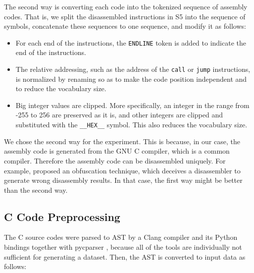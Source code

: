 \documentclass[senior,final,11pt]{iscs-thesis}
\begin{document}
The second way is converting each code into the tokenized sequence of assembly codes. 
That is, we split the disassembled instructions in S5 into the sequence of symbols, 
concatenate these sequences to one sequence, 
and modify it as follows:
\begin{itemize}
\item For each end of the instructions, the \texttt{ENDLINE} token is added to indicate the end of the instructions.
\item 
The relative addressing, such as the address of the \texttt{call} or \texttt{jump} instructions, 
is normalized by renaming so as to make the code position independent and to reduce the vocabulary size.
\item Big integer values are clipped. 
More specifically, an integer in the range from -255 to 256 are preserved as it is, and other integers are clipped and substituted with the \texttt{\_\_HEX\_\_} symbol.
This also reduces the vocabulary size.
\end{itemize}

We chose the second way for the experiment.
This is because, in our case, the assembly code is generated from the GNU C compiler, which is a common compiler.
Therefore the assembly code can be disassembled uniquely.
For example, \citet{disasm_obfuscate} proposed an obfuscation technique, which deceives a disassembler to generate wrong disassembly results.
In that case, the first way might be better than the second way.

\subsection{C Code Preprocessing}
The C source codes were parsed to AST by a Clang compiler \citep{clang} and its Python bindings together with pycparser \citep{pycparser}, 
because all of the tools are individually not sufficient for generating a dataset.
Then, the AST is converted to input data as follows:
\end{document}

